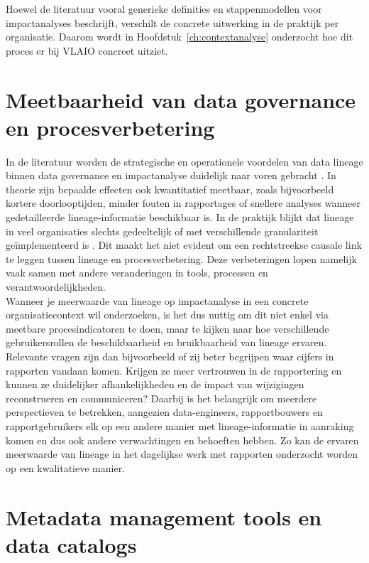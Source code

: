 Hoewel de literatuur vooral generieke definities en stappenmodellen voor impactanalyses beschrijft, verschilt de concrete uitwerking in de praktijk per organisatie. Daarom wordt in Hoofdstuk~\ref{ch:contextanalyse} onderzocht hoe dit proces er bij VLAIO concreet uitziet.

\section{Meetbaarheid van data governance en procesverbetering}

In de literatuur worden de strategische en operationele voordelen van data lineage binnen data governance en impactanalyse duidelijk naar voren gebracht \autocite{bernardo2024data,verma2024tracing}. In theorie zijn bepaalde effecten ook kwantitatief meetbaar, zoals bijvoorbeeld kortere doorlooptijden, minder fouten in rapportages of snellere analyses wanneer gedetailleerde lineage-in\-for\-ma\-tie beschikbaar is. In de praktijk blijkt dat lineage in veel organisaties slechts gedeeltelijk of met verschillende granulariteit geïmplementeerd is \autocite{eichler2021enterprise}. Dit maakt het niet evident om een rechtstreekse causale link te leggen tussen lineage en procesverbetering. Deze verbeteringen lopen namelijk vaak samen met andere veranderingen in tools, processen en verantwoordelijkheden.\\

Wanneer je meerwaarde van lineage op impactanalyse in een concrete organisatie\-context wil onderzoeken, is het dus nuttig om dit niet enkel via meetbare procesindicatoren te doen, maar te kijken naar hoe verschillende gebruikersrollen de beschikbaarheid en bruikbaarheid van lineage ervaren. Relevante vragen zijn dan bijvoorbeeld of zij beter begrijpen waar cijfers in rapporten vandaan komen. Krijgen ze meer vertrouwen in de rapportering en kunnen ze duidelijker afhankelijkheden en de impact van wijzigingen reconstrueren en communiceren? Daarbij is het belangrijk om meerdere perspectieven te betrekken, aangezien data-engineers, rapportbouwers en rapportgebruikers elk op een andere manier met lineage-in\-for\-ma\-tie in aanraking komen en dus ook andere verwachtingen en behoeften hebben. Zo kan de ervaren meerwaarde van lineage in het dagelijkse werk met rapporten onderzocht worden op een kwalitatieve manier.\\

\section{Metadata management tools en data catalogs}

